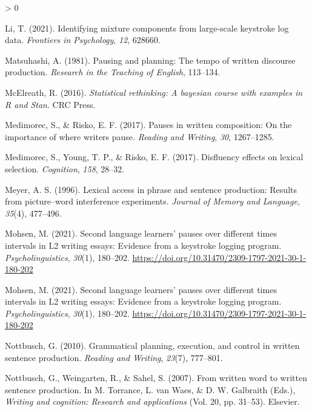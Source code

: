 \documentclass[
  english,
  man,floatsintext]{apa7}
\newlength{\cslhangindent}
\newenvironment{CSLReferences}[2] %
 {%
  \setlength{\parindent}{0pt}
  \ifodd #1 \everypar{\setlength{\hangindent}{\cslhangindent}}\ignorespaces\fi
  \ifnum #2 > 0
  \setlength{\parskip}{#2\baselineskip}
  \fi
 }%
 {}
\begin{document}
\begin{CSLReferences}{1}{0}
\leavevmode\hypertarget{ref-li2021identifying}{}%
Li, T. (2021). Identifying mixture components from large-scale keystroke log data. \emph{Frontiers in Psychology}, \emph{12}, 628660.

\leavevmode\hypertarget{ref-matsuhashi1981pausing}{}%
Matsuhashi, A. (1981). Pausing and planning: The tempo of written discourse production. \emph{Research in the Teaching of English}, 113--134.

\leavevmode\hypertarget{ref-mcelreath2016statistical}{}%
McElreath, R. (2016). \emph{Statistical rethinking: {A} bayesian course with examples in {R} and {Stan}}. CRC Press.

\leavevmode\hypertarget{ref-medimorec2017pauses}{}%
Medimorec, S., \& Risko, E. F. (2017). Pauses in written composition: On the importance of where writers pause. \emph{Reading and Writing}, \emph{30}, 1267--1285.

\leavevmode\hypertarget{ref-medimorec2017disfluency}{}%
Medimorec, S., Young, T. P., \& Risko, E. F. (2017). Disfluency effects on lexical selection. \emph{Cognition}, \emph{158}, 28--32.

\leavevmode\hypertarget{ref-meyer1996}{}%
Meyer, A. S. (1996). Lexical access in phrase and sentence production: Results from picture--word interference experiments. \emph{Journal of Memory and Language}, \emph{35}(4), 477--496.

\leavevmode\hypertarget{ref-mohsen2021second}{}%
Mohsen, M. (2021). Second language learners' pauses over different times intervals in {L2} writing essays: Evidence from a keystroke logging program. \emph{Psycholinguistics}, \emph{30}(1), 180--202. \url{https://doi.org/10.31470/2309-1797-2021-30-1-180-202}

\leavevmode\hypertarget{ref-mohsen2021second}{}%
Mohsen, M. (2021). Second language learners' pauses over different times intervals in {L2} writing essays: Evidence from a keystroke logging program. \emph{Psycholinguistics}, \emph{30}(1), 180--202. \url{https://doi.org/10.31470/2309-1797-2021-30-1-180-202}

\leavevmode\hypertarget{ref-not10}{}%
Nottbusch, G. (2010). Grammatical planning, execution, and control in written sentence production. \emph{Reading and Writing}, \emph{23}(7), 777--801.

\leavevmode\hypertarget{ref-not07}{}%
Nottbusch, G., Weingarten, R., \& Sahel, S. (2007). From written word to written sentence production. In M. Torrance, L. van Waes, \& D. W. Galbraith (Eds.), \emph{Writing and cognition: Research and applications} (Vol. 20, pp. 31--53). Elsevier.


\end{CSLReferences}
\end{document}
